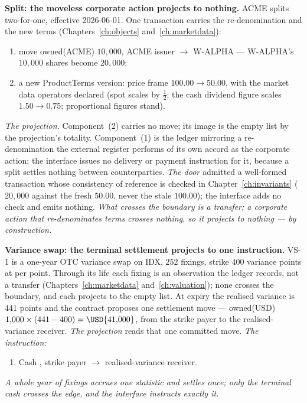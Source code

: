\medskip\noindent\textbf{Split: the moveless corporate action projects to nothing.}
ACME splits two-for-one, effective 2026-06-01. One transaction carries the
re-denomination and the new terms (Chapters~\ref{ch:objects} and~\ref{ch:marketdata}):
\begin{enumerate}[label=(\arabic*),nosep]
\item move owned(ACME) $10{,}000$, ACME issuer $\to$ W-ALPHA --- W-ALPHA's
$10{,}000$ shares become $20{,}000$;
\item a new ProductTerms version: price frame $100.00 \to 50.00$, with the market
data operators declared (spot scales by $\tfrac12$; the cash dividend figure scales
$1.50 \to 0.75$; proportional figures stand).
\end{enumerate}
\emph{The projection.} Component~(2) carries no move; its image is the empty list by
the projection's totality. Component~(1) is the ledger mirroring a re-denomination
the external register performs of its own accord as the corporate action; the
interface issues no delivery or payment instruction for it, because a split settles
nothing between counterparties.
\emph{The door} admitted a well-formed transaction whose consistency of reference
is checked in Chapter~\ref{ch:invariants} ($20{,}000$ against the fresh $50.00$,
never the stale $100.00$); the interface adds no check and emits nothing.
\emph{What crosses the boundary is a transfer; a corporate action that
re-denominates terms crosses nothing, so it projects to nothing --- by
construction.}

\medskip\noindent\textbf{Variance swap: the terminal settlement projects to one
instruction.} VS-1 is a one-year OTC variance swap on IDX, $252$ fixings, strike $400$
variance points at  per point. Through its life each fixing is an
observation the ledger records, not a transfer (Chapters~\ref{ch:marketdata}
and~\ref{ch:valuation}); none crosses the boundary, and each projects to the empty
list. At expiry the realised variance is $441$ points and the contract proposes one
settlement move --- owned(USD) $1{,}000\times(441-400) = \USD{41{,}000}$, from the
strike payer to the realised-variance receiver.
\emph{The projection} reads that one committed move.
\emph{The instruction:}
\begin{enumerate}[label=(\arabic*),nosep]
\item Cash , strike payer $\to$ realised-variance receiver.
\end{enumerate}
\emph{A whole year of fixings accrues one statistic and settles once; only the terminal
cash crosses the edge, and the interface instructs exactly it.}

